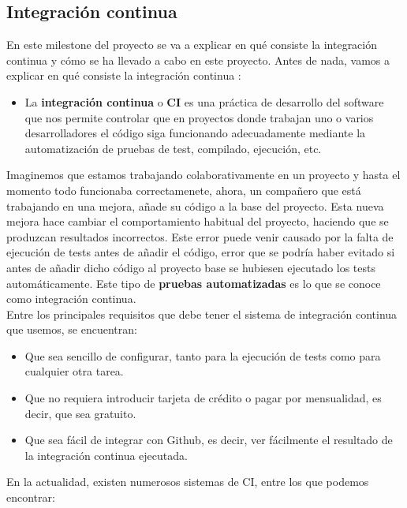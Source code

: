 \subsection{Integración continua}
En este milestone del proyecto se va a explicar en qué consiste la integración continua y
cómo se ha llevado a cabo en este proyecto. Antes de nada, vamos a explicar en qué consiste
la integración continua \cite{continuous-integration}:

    \begin{itemize}
        \item La \textbf{integración continua} o \textbf{CI} es una práctica de desarrollo
        del software que nos permite controlar que en proyectos donde trabajan uno o varios
        desarrolladores el código siga funcionando adecuadamente mediante la automatización
        de pruebas de test, compilado, ejecución, etc.
    \end{itemize}

Imaginemos que estamos trabajando colaborativamente en un proyecto y hasta el momento todo
funcionaba correctamenete, ahora, un compañero que está trabajando en una mejora, añade su
código a la base del proyecto. Esta nueva mejora hace cambiar el comportamiento habitual del
proyecto, haciendo que se produzcan resultados incorrectos. Este error puede venir causado
por la falta de ejecución de tests antes de añadir el código, error que se podría haber
evitado si antes de añadir dicho código al proyecto base se hubiesen ejecutado los tests
automáticamente. Este tipo de \textbf{pruebas automatizadas} es lo que se conoce como
integración continua.\\

Entre los principales requisitos que debe tener el sistema de integración continua que
usemos, se encuentran:

    \begin{itemize}
        \item Que sea sencillo de configurar, tanto para la ejecución de tests como para
        cualquier otra tarea.
        \item Que no requiera introducir tarjeta de crédito o pagar por mensualidad, es
        decir, que sea gratuito.
        \item Que sea fácil de integrar con Github, es decir, ver fácilmente el resultado
        de la integración continua ejecutada.
    \end{itemize}

En la actualidad, existen numerosos sistemas de CI, entre los que podemos encontrar:

